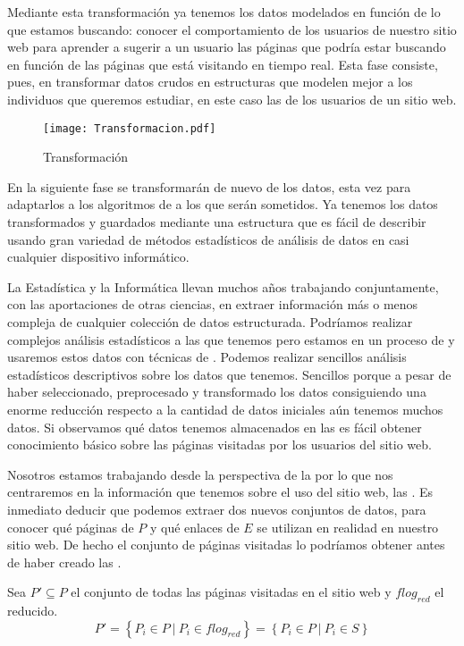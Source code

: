 Mediante esta transformación ya tenemos los datos modelados en función de lo que estamos buscando: conocer el comportamiento de los usuarios de nuestro sitio web para aprender a sugerir a un usuario las páginas que podría estar buscando en función de las páginas que está visitando en tiempo real. Esta fase consiste, pues, en transformar datos crudos en estructuras que modelen mejor a los individuos que queremos estudiar, en este caso las \sns de los usuarios de un sitio web.

\begin{wrapfigure}{o}{0.45\textwidth}
  \centering
  \texttt{[image: Transformacion.pdf]}
	\caption{Transformación}
	\label{fig:Transformacion}
\end{wrapfigure}
En la siguiente fase se transformarán de nuevo de los datos, esta vez para adaptarlos a los algoritmos de \dm a los que serán sometidos. Ya tenemos los datos transformados y guardados mediante una estructura que es fácil de describir usando gran variedad de métodos estadísticos de análisis de datos en casi cualquier dispositivo informático.

La Estadística y la Informática llevan muchos años trabajando conjuntamente, con las aportaciones de otras ciencias, en extraer información más o menos compleja de cualquier colección de datos estructurada. Podríamos realizar complejos análisis estadísticos a las \sns que tenemos pero estamos en un proceso de \wum y usaremos estos datos con técnicas de \dm. Podemos realizar sencillos análisis estadísticos descriptivos sobre los datos que tenemos. Sencillos porque a pesar de haber seleccionado, preprocesado y transformado los datos consiguiendo una enorme reducción respecto a la cantidad de datos iniciales aún tenemos muchos datos. Si observamos qué datos tenemos almacenados en las \sns es fácil obtener conocimiento básico sobre las páginas visitadas por los usuarios del sitio web.






Nosotros estamos trabajando desde la perspectiva de la \WUM por lo que nos centraremos en la información que tenemos sobre el uso del sitio web, las \sns. Es inmediato deducir que podemos extraer dos nuevos conjuntos de datos, para conocer qué páginas de $P$ y qué enlaces de $E$ se utilizan en realidad en nuestro sitio web. De hecho el conjunto de páginas visitadas lo podríamos obtener antes de haber creado las \sns.

\begin{Definition}\label{def:1-2-4-cjto-paginasVisitadasSW}
   Sea $P' \subseteq P$ el conjunto de todas las páginas visitadas en el sitio web y $flog_{red}$ el \flog reducido.
  \begin{equation}\label{eq:1-2-4-cjto-paginasVisitadasSW}
     P' = \left\{P_i \in P \ | \ P_i \in flog_{red}\right\} = \left\{P_i \in P \ | \ P_i \in S\right\}
  \end{equation}
\end{Definition}

